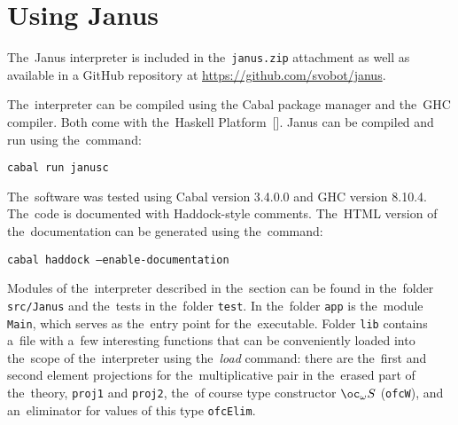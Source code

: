\chapter{Using Janus}

The~Janus interpreter is included in the~\texttt{janus.zip} attachment as well
as available in a GitHub repository at \url{https://github.com/svobot/janus}.

The~interpreter can be compiled using the Cabal package manager and the~GHC
compiler. Both come with the~Haskell Platform~[\citeauthor{haskell_platform}].
Janus can be compiled and run using the~command:
\begin{center}
  \texttt{cabal run janusc}
\end{center}
The~software was tested using Cabal version 3.4.0.0 and GHC version 8.10.4.
The~code is documented with Haddock-style comments. The~HTML version of
the~documentation can be generated using the~command:
\begin{center}
  \texttt{cabal haddock --enable-documentation}
\end{center}

Modules of the~interpreter described in the~section 
can be found in the~folder \texttt{src/Janus} and the~tests in the~folder
\texttt{test}. In the~folder \texttt{app} is the~module \texttt{Main}, which
serves as the~entry point for the~executable. Folder \texttt{lib} contains
a~file with a~few interesting functions that can be conveniently loaded into
the~scope of the~interpreter using the~\emph{load} command: there are
the~first and second element projections for the~multiplicative pair in
the~erased part of the~theory, \texttt{proj1} and \texttt{proj2}, the~of course
type constructor $\oc_\omega S$ (\texttt{ofcW}), and an~eliminator for values of
this type \texttt{ofcElim}.
